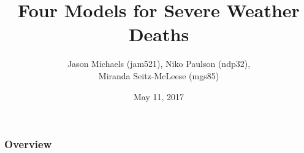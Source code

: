 \documentclass{beamer}
\title[Four Models]{Four Models for Severe Weather Deaths} %
\author{Jason Michaels (jam521), Niko Paulson (ndp32), \\Miranda Seitz-McLeese (mgs85) } %
\date{May 11, 2017} %
\begin{document}
	\begin{frame}
		\titlepage %
	\end{frame}
	
	\begin{frame}
		\frametitle{Overview} %
		\tableofcontents %
	\end{frame}
	
\end{document}
